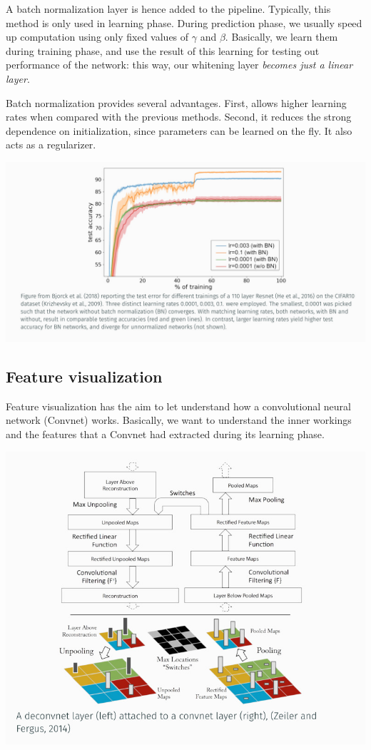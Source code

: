 \documentclass[10pt]{report}
\begin{document}
A batch normalization layer is hence added to the pipeline. Typically,
this method is only used in learning phase. During prediction phase, we
usually speed up computation using only fixed values of \(\gamma\) and
\(\beta\). Basically, we learn them during training phase, and use the
result of this learning for testing out performance of the network: this
way, our whitening layer \emph{becomes just a linear layer}.

Batch normalization provides several advantages. First, allows higher
learning rates when compared with the previous methods. Second, it
reduces the strong dependence on initialization, since parameters can be
learned on the fly. It also acts as a regularizer.

\begin{center}
\includegraphics[width=.9\linewidth]{./pics/cnn/batch-normalization-graph.jpg}
\end{center}

\subsection{Feature visualization}
\label{feature-visualization}
Feature visualization has the aim to let understand how a convolutional
neural network (Convnet) works. Basically, we want to understand the
inner workings and the features that a Convnet had extracted during its
learning phase.

\begin{center}
\includegraphics[width=.9\linewidth]{./pics/cnn/deconvnet.jpg}
\end{center}
\end{document}
